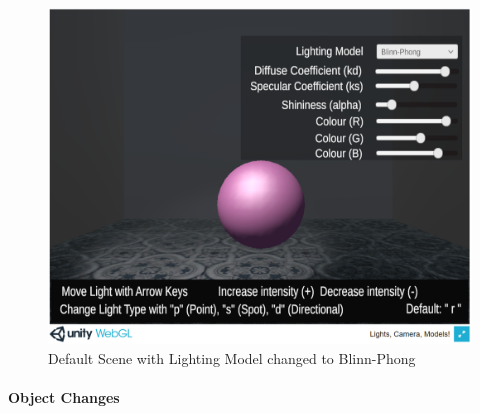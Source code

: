\documentclass[12pt, titlepage]{article}
\begin{document}
\begin{enumerate}
	\begin{figure}[h]
		\centering
		\includegraphics[scale=0.25]{./images/fromVnVPlan/sphere-lit-blinnphong}
		\caption{Default Scene with Lighting Model changed to Blinn-Phong}
		\label{fig:blinnPhong}
	\end{figure}
	
	
\end{enumerate}

\paragraph{Object Changes}
\end{document}
